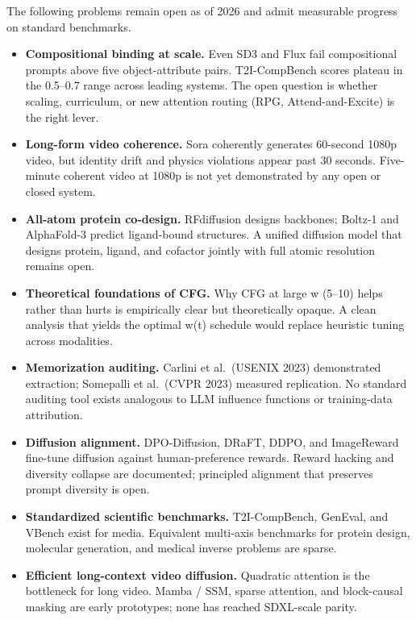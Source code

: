 \documentclass{article}
\begin{document}
The following problems remain open as of 2026 and admit measurable progress on standard benchmarks.

\begin{itemize}

\item
  \textbf{Compositional binding at scale.} Even SD3 and Flux fail compositional prompts above five object-attribute pairs. T2I-CompBench scores plateau in the 0.5--0.7 range across leading systems. The open question is whether scaling, curriculum, or new attention routing (RPG, Attend-and-Excite) is the right lever.
\item
  \textbf{Long-form video coherence.} Sora coherently generates 60-second 1080p video, but identity drift and physics violations appear past 30 seconds. Five-minute coherent video at 1080p is not yet demonstrated by any open or closed system.
\item
  \textbf{All-atom protein co-design.} RFdiffusion designs backbones; Boltz-1 and AlphaFold-3 predict ligand-bound structures. A unified diffusion model that designs protein, ligand, and cofactor jointly with full atomic resolution remains open.
\item
  \textbf{Theoretical foundations of CFG.} Why CFG at large w (5--10) helps rather than hurts is empirically clear but theoretically opaque. A clean analysis that yields the optimal w(t) schedule would replace heuristic tuning across modalities.
\item
  \textbf{Memorization auditing.} Carlini et al.~(USENIX 2023) demonstrated extraction; Somepalli et al.~(CVPR 2023) measured replication. No standard auditing tool exists analogous to LLM influence functions or training-data attribution.
\item
  \textbf{Diffusion alignment.} DPO-Diffusion, DRaFT, DDPO, and ImageReward fine-tune diffusion against human-preference rewards. Reward hacking and diversity collapse are documented; principled alignment that preserves prompt diversity is open.
\item
  \textbf{Standardized scientific benchmarks.} T2I-CompBench, GenEval, and VBench exist for media. Equivalent multi-axis benchmarks for protein design, molecular generation, and medical inverse problems are sparse.
\item
  \textbf{Efficient long-context video diffusion.} Quadratic attention is the bottleneck for long video. Mamba / SSM, sparse attention, and block-causal masking are early prototypes; none has reached SDXL-scale parity.
\end{itemize}
\end{document}
